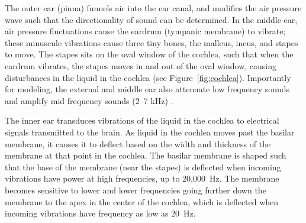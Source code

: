 The outer ear (pinna) funnels air
into the ear canal,
and modifies the air pressure wave
such that the directionality
of sound can be determined.
In the middle ear,
air pressure fluctuations
cause the eardrum (tympanic membrane)
to vibrate;
these minuscule vibrations
cause three tiny bones,
the malleus, incus, and stapes to move.
The stapes sits on the oval window
of the cochlea,
such that when the eardrum vibrates,
the stapes moves in and out of the oval window,
causing disturbances in the liquid
in the cochlea
(see Figure~\ref{fig:cochlea}).
Importantly for modeling,
the external and middle ear
also attenuate low frequency sounds
and amplify mid frequency sounds
(2--7 kHz)
\citep{rosowski1996,ballachanda1997}.


The inner ear transduces vibrations
of the liquid in the cochlea
to electrical signals transmitted
to the brain.
As liquid in the cochlea
moves past the basilar membrane,
it causes it to deflect
based on the width and thickness
of the membrane at that point
in the cochlea.
The basilar membrane
is shaped such that
the base of the membrane
(near the stapes)
is deflected when
incoming vibrations have power
at high frequencies,
up to 20,000~Hz.
The membrane becomes sensitive
to lower and lower frequencies
going further down the membrane
to the apex
in the center of the cochlea,
which is deflected when incoming vibrations
have frequency as low as 20~Hz.

